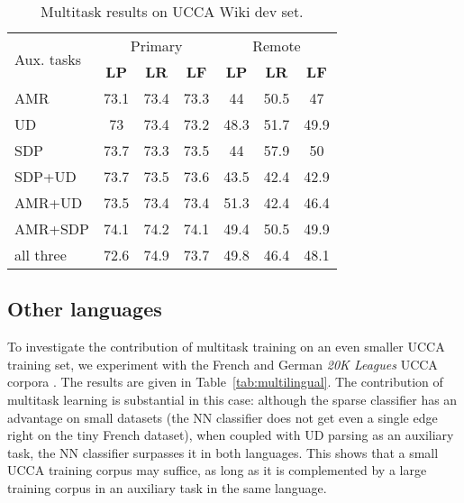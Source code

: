 \documentclass[11pt,a4paper]{article}
\begin{document}
\begin{table}
\begin{tabular}{l|ccc|ccc}
\multirow{2}{1cm}{Aux. tasks} & \multicolumn{3}{c|}{Primary} & \multicolumn{3}{c}{Remote} \\
& \textbf{LP} & \textbf{LR} & \textbf{LF} & \textbf{LP} & \textbf{LR} & \textbf{LF} \\
\hline
\small AMR & 73.1 & 73.4 & 73.3 & 44 & 50.5 & 47\\
\small UD & 73 & 73.4 & 73.2 & 48.3 & 51.7 & 49.9 \\
\small SDP & 73.7 & 73.3 & 73.5 & 44 & 57.9 & 50 \\
\small SDP+UD & 73.7 & 73.5 & 73.6 & 43.5 & 42.4 & 42.9 \\
\small AMR+UD & 73.5 & 73.4 & 73.4 & 51.3 & 42.4 & 46.4 \\
\small AMR+SDP & 74.1 & 74.2 & 74.1 & 49.4 & 50.5 & 49.9 \\
\small all three & 72.6 & 74.9 & 73.7 & 49.8 & 46.4 & 48.1
\end{tabular}
\caption{Multitask results on UCCA Wiki dev set.
\label{tab:multi}}
\end{table}


\subsection{Other languages}\label{sec:multilingual}

To investigate the contribution of multitask training on an even smaller UCCA training set,
we experiment with the French and German \textit{20K Leagues} UCCA corpora
\cite{sulem2015conceptual}.
The results are given in Table~\ref{tab:multilingual}.
The contribution of multitask learning is substantial in this case:
although the sparse classifier has an advantage on small datasets
(the NN classifier does not get even a single edge right on the tiny French dataset),
when coupled with UD parsing as an auxiliary task, the NN classifier surpasses it
in both languages.
This shows that a small UCCA training corpus may suffice, as long as it is complemented by
a large training corpus in an auxiliary task in the same language.
\end{document}
